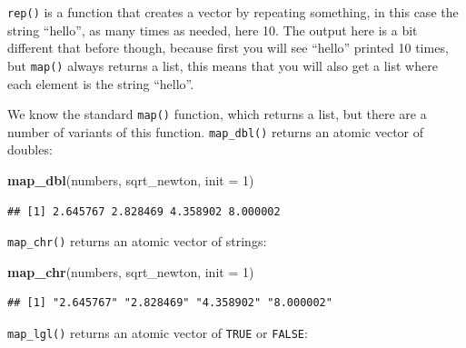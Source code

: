 \documentclass[]{gitbook}
\newenvironment{Shaded}{\begin{snugshade}}{\end{snugshade}}
\newcommand{\ControlFlowTok}[1]{\textcolor[rgb]{0.13,0.29,0.53}{\textbf{#1}}}
\newcommand{\DataTypeTok}[1]{\textcolor[rgb]{0.13,0.29,0.53}{#1}}
\newcommand{\DecValTok}[1]{\textcolor[rgb]{0.00,0.00,0.81}{#1}}
\newcommand{\KeywordTok}[1]{\textcolor[rgb]{0.13,0.29,0.53}{\textbf{#1}}}
\newcommand{\NormalTok}[1]{#1}
\newcommand{\OperatorTok}[1]{\textcolor[rgb]{0.81,0.36,0.00}{\textbf{#1}}}
\newcommand{\OtherTok}[1]{\textcolor[rgb]{0.56,0.35,0.01}{#1}}
\newcommand{\StringTok}[1]{\textcolor[rgb]{0.31,0.60,0.02}{#1}}
\theoremstyle{definition}
\theoremstyle{definition}
\theoremstyle{definition}
\theoremstyle{remark}
\begin{document}
\texttt{rep()} is a function that creates a vector by repeating
something, in this case the string ``hello'', as many times as needed,
here 10. The output here is a bit different that before though, because
first you will see ``hello'' printed 10 times, but \texttt{map()} always
returns a list, this means that you will also get a list where each
element is the string ``hello''.

We know the standard \texttt{map()} function, which returns a list, but
there are a number of variants of this function. \texttt{map\_dbl()}
returns an atomic vector of doubles:

\begin{Shaded}
\begin{Highlighting}[]
\KeywordTok{map_dbl}\NormalTok{(numbers, sqrt_newton, }\DataTypeTok{init =} \DecValTok{1}\NormalTok{)}
\end{Highlighting}
\end{Shaded}

\begin{verbatim}
## [1] 2.645767 2.828469 4.358902 8.000002
\end{verbatim}

\texttt{map\_chr()} returns an atomic vector of strings:

\begin{Shaded}
\begin{Highlighting}[]
\KeywordTok{map_chr}\NormalTok{(numbers, sqrt_newton, }\DataTypeTok{init =} \DecValTok{1}\NormalTok{)}
\end{Highlighting}
\end{Shaded}

\begin{verbatim}
## [1] "2.645767" "2.828469" "4.358902" "8.000002"
\end{verbatim}

\texttt{map\_lgl()} returns an atomic vector of \texttt{TRUE} or
\texttt{FALSE}:

\begin{Shaded}
\end{Shaded}
\end{document}
